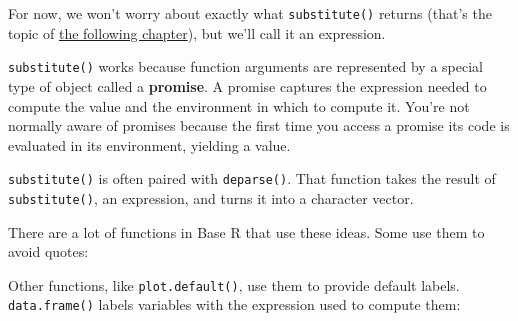 For now, we won't worry about exactly what \texttt{substitute()} returns
(that's the topic of \hyperref[metaprogramming]{the following chapter}),
but we'll call it an expression.

\texttt{substitute()} works because function arguments are represented
by a special type of object called a \textbf{promise}. A promise
captures the expression needed to compute the value and the environment
in which to compute it. You're not normally aware of promises because
the first time you access a promise its code is evaluated in its
environment, yielding a value. 

\texttt{substitute()} is often paired with \texttt{deparse()}. That
function takes the result of \texttt{substitute()}, an expression, and
turns it into a character vector. 

\begin{Shaded}
\begin{Highlighting}[]
\StringTok{ }\NormalTok{(}
\NormalTok{(}\NormalTok{:}\NormalTok{)}
\StringTok{ }\NormalTok{)}
\end{Highlighting}
\end{Shaded}

There are a lot of functions in Base R that use these ideas. Some use
them to avoid quotes:

\begin{Shaded}
\begin{Highlighting}[]
\NormalTok{(}\NormalTok{)}
\end{Highlighting}
\end{Shaded}

Other functions, like \texttt{plot.default()}, use them to provide
default labels. \texttt{data.frame()} labels variables with the
expression used to compute them:

\begin{Shaded}
\begin{Highlighting}[]
\StringTok{ }\NormalTok{:}
\StringTok{ }\NormalTok{letters[}\NormalTok{:}\NormalTok{]}
\NormalTok{(}
\end{Highlighting}
\end{Shaded}

